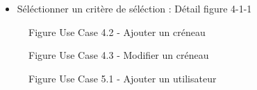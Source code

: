 \documentclass[a4paper, 11pt]{article}
\begin{document}
        \begin{itemize}
        \item Séléctionner un critère de séléction : Détail figure 4-1-1
        \end{itemize}
	\clearpage
	\begin{figure}[h]
        \caption{Figure Use Case 4.2 - Ajouter un créneau}
        \label{fig-diag-use-case-4-2}
        \end{figure}
	\begin{figure}[h]
        \label{fig-diag-use-case-4-3}
        \caption{Figure Use Case 4.3 - Modifier un créneau}
        \end{figure}
        \clearpage
	\begin{figure}[!h]
        \caption{Figure Use Case 5.1 - Ajouter un utilisateur}
        \label{fig-diag-use-case-5-1}
        \end{figure}
\end{document}
